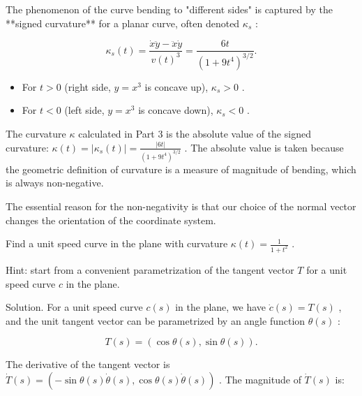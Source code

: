 \documentclass[10pt]{article}
\begin{document}
The phenomenon of the curve bending to "different sides" is captured by the **signed curvature** for a planar curve, often denoted \({\kappa }_{s}\) :

\[
{\kappa }_{s}\left( t\right)  = \frac{\dot{x}\ddot{y} - \ddot{x}\dot{y}}{v{\left( t\right) }^{3}} = \frac{6t}{{\left( 1 + 9{t}^{4}\right) }^{3/2}}.
\]

\begin{itemize}\relax
\item\relax For \(t > 0\) (right side, \(y = {x}^{3}\) is concave up), \({\kappa }_{s} > 0\) .
\end{itemize}

\begin{itemize}\relax
\item\relax For \(t < 0\) (left side, \(y = {x}^{3}\) is concave down), \({\kappa }_{s} < 0\) .
\end{itemize}

The curvature \(\kappa\) calculated in Part 3 is the absolute value of the signed curvature: \(\kappa \left( t\right)  = \left| {{\kappa }_{s}\left( t\right) }\right|  = \frac{\left| 6t\right| }{{\left( 1 + 9{t}^{4}\right) }^{3/2}}\) . The absolute value is taken because the geometric definition of curvature is a measure of magnitude of bending, which is always non-negative.

The essential reason for the non-negativity is that our choice of the normal vector changes the orientation of the coordinate system.

\begin{problem}[title=PROBLEM 6 (5 POINTS)]
Find a unit speed curve in the plane with curvature \(\kappa \left( t\right)  = \frac{1}{1 + {t}^{2}}\) .

Hint: start from a convenient parametrization of the tangent vector \(T\) for a unit speed curve \(c\) in the plane.
\end{problem}

Solution. For a unit speed curve \(c\left( s\right)\) in the plane, we have \(\dot{c}\left( s\right)  = T\left( s\right)\) , and the unit tangent vector can be parametrized by an angle function \(\theta \left( s\right)\) :

\[
T\left( s\right)  = \left( {\cos \theta \left( s\right) ,\sin \theta \left( s\right) }\right) .
\]

The derivative of the tangent vector is \(\dot{T}\left( s\right)  = \left( {-\sin \theta \left( s\right) \dot{\theta }\left( s\right) ,\cos \theta \left( s\right) \dot{\theta }\left( s\right) }\right)\) . The magnitude of \(\dot{T}\left( s\right)\) is:
\end{document}
